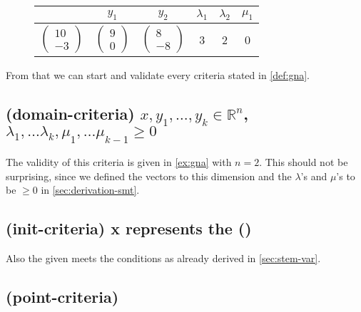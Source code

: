 \begin{figure}[H]
	\label{ex:gna}
	\centering
	\begin{tabular}{|c|c|c|c|c|c|}
		\hline
		\stem & $y_1$ & $y_2$ & $\lambda_1$ & $\lambda_2$ & $\mu_1$ \\ \hline
		$\begin{pmatrix} 10 \\ -3 \end{pmatrix}$ & $\begin{pmatrix} 9 \\ 0 \end{pmatrix}$ & $\begin{pmatrix} 8 \\ -8 \end{pmatrix}$ & 3 & 2 & 0 \\ \hline
	\end{tabular}
\end{figure}
From that we can start and validate every criteria stated in \autoref{def:gna}.

	\subsection[Verifying: domain-criteria]{(domain-criteria)	$x, y_1, \dots, y_k \in \mathbb{R}^n$, $\lambda_1, \dots \lambda_k, \mu_1, \dots \mu_{k-1} \ge 0$ }
		The validity of this criteria is given in \autoref{ex:gna} with $n=2$. This should not be surprising, since we defined the vectors to this dimension and the $\lambda$'s and $\mu$'s to be $\ge 0$ in \autoref{sec:derivation-smt}.
		
	\subsection[Verifying: init-criteria]{(init-criteria) x represents the \startterm (\stem)}
	Also the given \stem meets the conditions as already derived in \autoref{sec:stem-var}.
	
	\newsavebox{\pointcrit}%
	\subsection[Verifying: point-criteria]{(point-criteria) \usebox{\pointcrit} }
	
